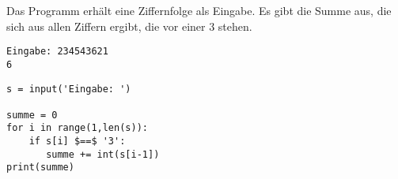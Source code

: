 \question[4]

Das Programm erhält eine Ziffernfolge als Eingabe.
Es gibt die Summe aus, die sich aus allen Ziffern ergibt, die vor einer 3 stehen.

\begin{lstlisting}
Eingabe: 234543621
6
\end{lstlisting}

\begin{solutionbox}{5cm}
\begin{lstlisting}
s = input('Eingabe: ')

summe = 0
for i in range(1,len(s)):
    if s[i] $==$ '3':
       summe += int(s[i-1])
print(summe)
\end{lstlisting}
\end{solutionbox}

